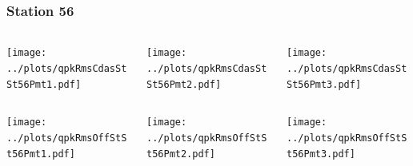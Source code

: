\documentclass[aspectratio=169]{beamer}
\begin{document}
\begin{frame} 
  \frametitle{Station 56}
  \begin{center}
    \begin{columns}
      \begin{column}{0.33\textwidth}
        \texttt{[image: ../plots/qpkRmsCdasStSt56Pmt1.pdf]}
      \end{column}
      \begin{column}{0.33\textwidth}
        \texttt{[image: ../plots/qpkRmsCdasStSt56Pmt2.pdf]}
      \end{column}
      \begin{column}{0.33\textwidth}
        \texttt{[image: ../plots/qpkRmsCdasStSt56Pmt3.pdf]}
      \end{column}
    \end{columns}
  \end{center}

  \begin{center}
    \begin{columns}
      \begin{column}{0.33\textwidth}
        \texttt{[image: ../plots/qpkRmsOffStSt56Pmt1.pdf]}
      \end{column}
      \begin{column}{0.33\textwidth}
        \texttt{[image: ../plots/qpkRmsOffStSt56Pmt2.pdf]}
      \end{column}
      \begin{column}{0.33\textwidth}
        \texttt{[image: ../plots/qpkRmsOffStSt56Pmt3.pdf]}
      \end{column}
    \end{columns}
  \end{center}
\end{frame}
\end{document}
